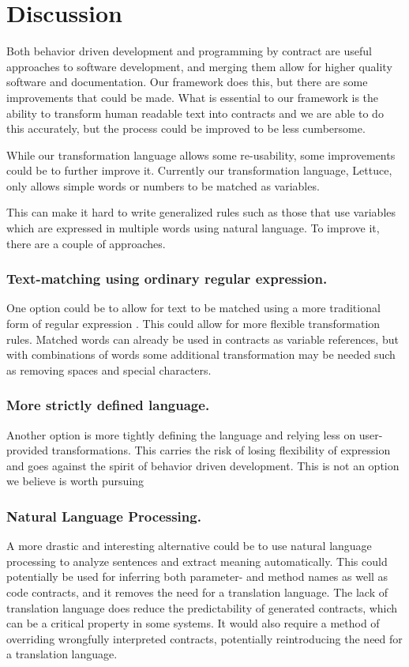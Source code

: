 \section{Discussion}
Both behavior driven development and programming by contract are useful approaches to software development, and merging them allow for higher quality software and documentation.
Our framework does this, but there are some improvements that could be made.
What is essential to our framework is the ability to transform human readable text into contracts and we are able to do this accurately, but the process could be improved to be less cumbersome.

While our transformation language allows some re-usability, some improvements could be to further improve it.
Currently our transformation language, Lettuce, only allows simple words or numbers to be matched as variables.

This can make it hard to write generalized rules such as those that use variables which are expressed in multiple words using natural language.
To improve it, there are a couple of approaches.

\subsubsection{Text-matching using ordinary regular expression.}
One option could be to allow for text to be matched using a more traditional form of regular expression \cite{thompson1968programming}.
This could allow for more flexible transformation rules.
Matched words can already be used in contracts as variable references, but with combinations of words some additional transformation may be needed such as removing spaces and special characters.

\subsubsection{More strictly defined language.}
Another option is more tightly defining the language and relying less on user-provided transformations.
This carries the risk of losing flexibility of expression and goes against the spirit of behavior driven development.
This is not an option we believe is worth pursuing

\subsubsection{Natural Language Processing.}
A more drastic and interesting alternative could be to use natural language processing \cite{jurafsky2002speech} to analyze sentences and extract meaning automatically.
This could potentially be used for inferring both parameter- and method names as well as code contracts, and it removes the need for a translation language.
The lack of translation language does reduce the predictability of generated contracts, which can be a critical property in some systems.
It would also require a method of overriding wrongfully interpreted contracts, potentially reintroducing the need for a translation language.

